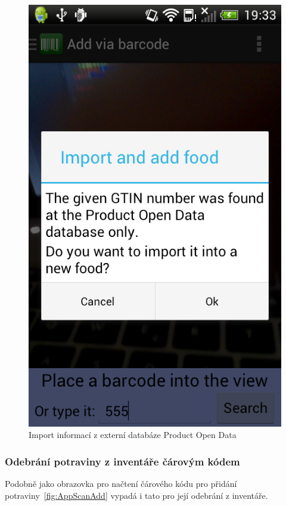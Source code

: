 \documentclass[thesis=B,czech]{FITthesis}[2013/10/20]
\begin{document}
\begin{figure}[H]
\begin{minipage}{0.5\linewidth}
    \includegraphics[scale=0.3]{screenshots/app_scan_add_import.png}
    \caption{Import informací z externí databáze Product Open Data}
    \label{fig:AppScanAddImport}
  \end{minipage} 
\end{figure}

\clearpage

\subsubsection{Odebrání potraviny z inventáře čárovým kódem}

Podobně jako obrazovka pro načtení čárového kódu pro přidání potraviny~\ref{fig:AppScanAdd} vypadá i tato pro její odebrání z inventáře.
\end{document}

